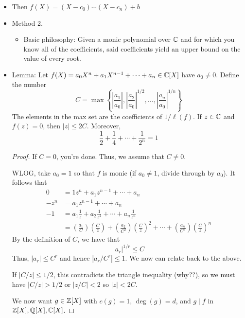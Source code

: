 \documentclass[../notes.tex]{subfiles}
\begin{document}
\begin{itemize}
    \item Then $f(X)=(X-c_0)\cdots(X-c_n)+b$
    \item Method 2.
    \begin{itemize}
        \item Basic philosophy: Given a monic polynomial over $\mathbb{C}$ and for which you know all of the coefficients, said coefficients yield an upper bound on the value of every root.
    \end{itemize}
    \item Lemma: Let $f(X)=a_0X^n+a_1X^{n-1}+\cdots+a_n\in\mathbb{C}[X]$ have $a_0\neq 0$. Define the number
    \begin{equation*}
        C = \max\left\{ \left| \frac{a_1}{a_0} \right|,\left| \frac{a_2}{a_0} \right|^{1/2},\dots,\left| \frac{a_n}{a_0} \right|^{1/n} \right\}
    \end{equation*}
    The elements in the max set are the coefficients of $1/\ell(f)$. If $z\in\mathbb{C}$ and $f(z)=0$, then $|z|\leq 2C$. Moreover,
    \begin{equation*}
        \frac{1}{2}+\frac{1}{4}+\cdots+\frac{1}{2^n} = 1
    \end{equation*}
    \begin{proof}
        If $C=0$, you're done. Thus, we assume that $C\neq 0$.\par
        WLOG, take $a_0=1$ so that $f$ is monic (if $a_0\neq 1$, divide through by $a_0$). It follows that
        \begin{align*}
            0 &= 1z^n+a_1z^{n-1}+\cdots+a_n\\
            -z^n &= a_1z^{n-1}+\cdots+a_n\\
            -1 &= a_1\frac{1}{z}+a_2\frac{1}{z^2}+\cdots+a_n\frac{1}{z^n}\\
            &= \left( \frac{a_1}{C} \right)\left( \frac{C}{z} \right)+\left( \frac{a_2}{C^2} \right)\left( \frac{C}{z} \right)^2+\cdots+\left( \frac{a_n}{C^n} \right)\left( \frac{C}{z} \right)^n
        \end{align*}
        By the definition of $C$, we have that
        \begin{equation*}
            |a_r|^{1/r} \leq C
        \end{equation*}
        Thus, $|a_r|\leq C^r$ and hence $|a_r/C^r|\leq 1$. We now can relate back to the above.\par
        If $|C/z|\leq 1/2$, this contradicts the triangle inequality (why??), so we must have $|C/z|>1/2$ or $|z/C|<2$ so $|z|<2C$.\par
        We now want $g\in\mathbb{Z}[X]$ with $c(g)=1$, $\deg(g)=d$, and $g\mid f$ in $\mathbb{Z}[X],\mathbb{Q}[X],\mathbb{C}[X]$.

\end{proof}
\end{itemize}
\end{document}
